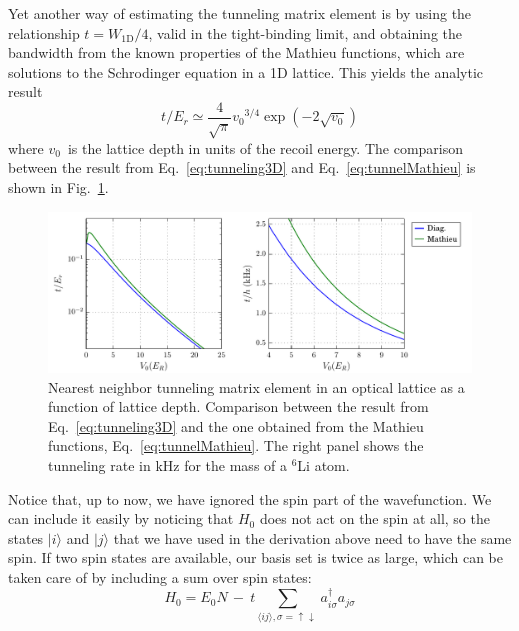 \documentclass[oneside,11pt]{memoir}
\newcommand{\vvo}{\ensuremath{v_{0}}}
\newcommand{\er}{\ensuremath{E_{r}}}
\newcommand{\dbl}{\ensuremath{ \uparrow\! \downarrow \, }}
\begin{document}
Yet another way of estimating the tunneling matrix element \cite{Bloch2008} is
by using the relationship $t=W_{\text{1D}}/4$, valid in the tight-binding
limit,  and obtaining the bandwidth from the known properties of the Mathieu
functions, which are solutions to the Schrodinger equation in a 1D lattice.
This yields the analytic result 
\begin{equation}
 t/\er \simeq \frac{4}{\sqrt{\pi}} \vvo^{3/4} \exp(-2\sqrt{\vvo}) 
\label{eq:tunnelMathieu}
\end{equation} 
where \vvo\ is the lattice depth in units of the recoil energy. The comparison
between the result from Eq.~\ref{eq:tunneling3D} and Eq.~\ref{eq:tunnelMathieu}
is shown in Fig.~\ref{fig:tMathieu}. 
\begin{figure}
\centering
\includegraphics[width=\textwidth]{../figures/BandStructure_figures/tunneling_V0_Mathieu.pdf}
\caption[Nearest neighbor tunneling matrix element]{\small Nearest neighbor
tunneling matrix element in an optical lattice as a function of lattice depth.
Comparison between the result from Eq.~\ref{eq:tunneling3D} and the one
obtained from the Mathieu functions, Eq.~\ref{eq:tunnelMathieu}.  The right
panel shows the tunneling rate in kHz for the mass of a $^{6}$Li atom.  }
\label{fig:tMathieu}
\end{figure}


Notice that, up to now, we have ignored the spin part of the wavefunction.   We
can include it easily by noticing that $H_{0}$ does not act on the spin at
all, so the states $|i\rangle$ and $|j\rangle$ that we have used in the
derivation above need to have the same spin.   If two spin states are
available, our basis set is twice as large, which can be taken care of by
including a sum over spin states:
\begin{equation}
  H_{0} = E_{0}N\, -\ t
   \!\!\! 
  \sum_{ \langle ij \rangle, \sigma=\dbl   } 
   \!\!\!
  a_{i\sigma}^{\dagger}a_{j\sigma} 
\end{equation}
\end{document}

